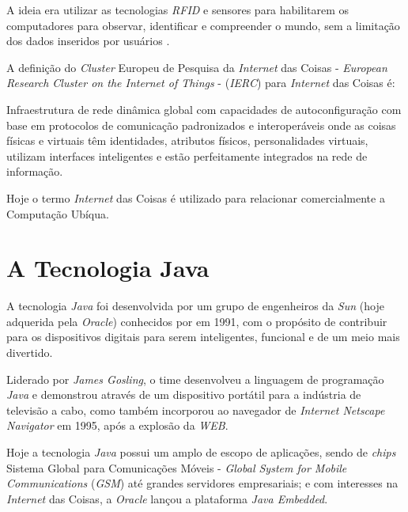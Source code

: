 A ideia era utilizar as tecnologias \textit{RFID} e sensores para habilitarem 
os computadores para observar, identificar e compreender o mundo, sem a 
limitação dos dados inseridos por usuários \cite{kevinashton2009}.

\newpage
A definição do \textit{Cluster} Europeu de Pesquisa da \textit{Internet} das 
Coisas - \textit{European Research Cluster on the Internet of Things} - 
(\textit{IERC}) \cite[p. ~26]{iangsmith2012} para \textit{Internet} das Coisas 
é:

\begin{citacao}
    Infraestrutura de rede dinâmica global com capacidades de autoconfiguração 
    com base em protocolos de comunicação padronizados e interoperáveis onde as 
    coisas físicas e virtuais têm identidades, atributos físicos, 
    personalidades virtuais, utilizam interfaces inteligentes e estão 
    perfeitamente integrados na rede de informação.
\end{citacao}

Hoje o termo \textit{Internet} das Coisas é utilizado para relacionar 
comercialmente a Computação Ubíqua.

\section{A Tecnologia Java}

A tecnologia \textit{Java} foi desenvolvida por um grupo de engenheiros da 
\textit{Sun} (hoje adquerida pela \textit{Oracle}) conhecidos por 
 em 1991, com o propósito de contribuir para os 
dispositivos digitais para serem inteligentes, funcional e de um meio mais 
divertido.

Liderado por \textit{James Gosling}, o time desenvolveu a linguagem de 
programação \textit{Java} e demonstrou através de um dispositivo portátil para 
a indústria de televisão a cabo, como também incorporou ao navegador de 
\textit{Internet Netscape Navigator} em 1995, após a explosão da \textit{WEB}.

Hoje a tecnologia \textit{Java} possui um amplo de escopo de aplicações, sendo 
de \textit{chips} Sistema Global para Comunicações Móveis - \textit{Global 
System for Mobile Communications} (\textit{GSM}) até grandes servidores 
empresariais; e com interesses na \textit{Internet} das Coisas, a 
\textit{Oracle} lançou a plataforma \textit{Java Embedded}.
